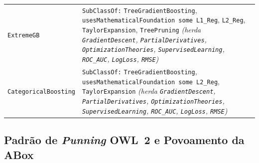 \documentclass[11pt,a4paper]{article}
\newcommand{\onto}[1]{\texttt{#1}}
\begin{document}
\begin{table}[htbp]
\begin{tabularx}{\textwidth}{@{}p{3.6cm}>{\raggedright\arraybackslash}X@{}}
\addlinespace[3pt]
\onto{ExtremeGB} & \onto{SubClassOf:} \onto{TreeGradientBoosting}, \onto{usesMathematicalFoundation some L1\_Reg}, \onto{L2\_Reg}, \onto{TaylorExpansion}, \onto{TreePruning} \emph{(herda \onto{GradientDescent}, \onto{PartialDerivatives}, \onto{OptimizationTheories}, \onto{SupervisedLearning}, \onto{ROC\_AUC}, \onto{LogLoss}, \onto{RMSE})} \\
\addlinespace[3pt]
\onto{CategoricalBoosting} & \onto{SubClassOf:} \onto{TreeGradientBoosting}, \onto{usesMathematicalFoundation some L2\_Reg}, \onto{TaylorExpansion} \emph{(herda \onto{GradientDescent}, \onto{PartialDerivatives}, \onto{OptimizationTheories}, \onto{SupervisedLearning}, \onto{ROC\_AUC}, \onto{LogLoss}, \onto{RMSE})} \\
\bottomrule
\end{tabularx}
\end{table}

\subsection{Padrão de \emph{Punning} OWL~2 e Povoamento da ABox}
\end{document}
